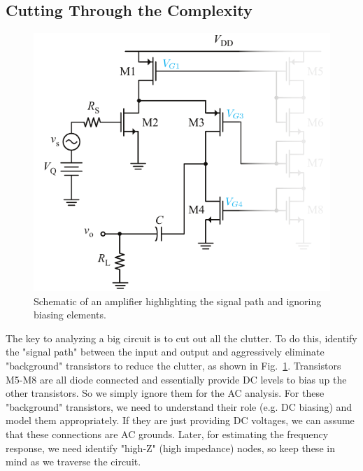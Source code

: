 \subsection{Cutting Through the Complexity}
\begin{figure}[tb]
\centering
\includegraphics[scale=1]{17cascode_folded_declutter}
\caption{Schematic of an amplifier highlighting the signal path and ignoring biasing elements.} \label{fig:17cascode_folded_declutter}
\end{figure}
The key to analyzing a big circuit is to cut out all the clutter.  To do this, identify the "signal path" between the input and output and aggressively eliminate "background" transistors to reduce the clutter, as shown in Fig.~\ref{fig:17cascode_folded_declutter}.  Transistors M5-M8 are all diode connected and essentially provide DC levels to bias up the other transistors.  So we simply ignore them for the AC analysis.  For these "background" transistors, we need to understand their role (e.g. DC biasing) and model them appropriately.  If they are just providing DC voltages, we can assume that these connections are AC grounds.  Later, for estimating the frequency response, we need identify "high-Z" (high impedance) nodes, so keep these in mind as we traverse the circuit.
